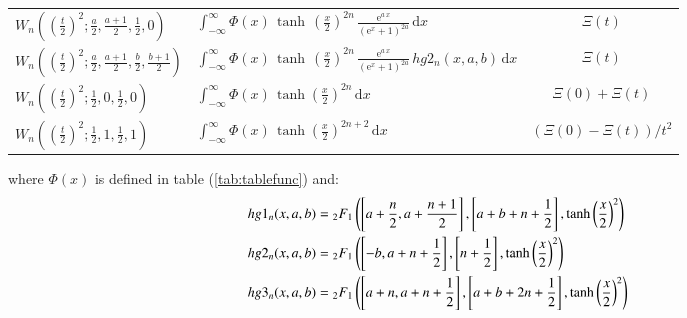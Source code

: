 \documentclass[a4paper,11pt,twoside]{amsart}
\newcommand{\defeq}{=}
\newcommand{\defeq}{\stackrel{\scriptscriptstyle \textnormal{def}}{=}}
\begin{document}
{\begin{minipage}{\textwidth}
\begin{table}[H]
\begin{center}
\begin{tabular}{l|l|c|}
      $W_{n}\left(\left(\frac{t}{2}\right)^2;\frac{a}{2},\frac{a+1}{2},\frac12,0\right) $ & $\displaystyle \int_{-\infty}^{\infty} \Phi(x)\,\tanh\,\left(\frac{x}{2}\right)^{2n}\,\frac{\textrm{e}^{a\,x}}{(\textrm{e}^x+1)^{2a}}\,\mathrm{d}x$ &$\Xi(t)$ \\
      $W_{n}\left(\left(\frac{t}{2}\right)^2;\frac{a}{2},\frac{a+1}{2},\frac{b}{2},\frac{b+1}{2}\right)$ & $\displaystyle \int_{-\infty}^{\infty} \Phi(x)\,\tanh\,\left(\frac{x}{2}\right)^{2n}\,\frac{\textrm{e}^{a\,x}}{(\textrm{e}^x+1)^{2a}} \,hg2_n(x,a,b) \,\mathrm{d}x$ &$\Xi(t)$ \\
      $W_n\left(\left(\frac{t}{2}\right)^2;\frac12,0,\frac12,0\right)$ & $\displaystyle \int_{-\infty}^\infty \Phi(x)\,\tanh\left(\frac{x}{2}\right)^{2n}\, \mathrm{d}x $  &$\Xi(0) + \Xi(t)$ \\    
      $W_n\left(\left(\frac{t}{2}\right)^2;\frac12,1,\frac12,1\right)$ & $\displaystyle \int_{-\infty}^\infty \Phi(x)\,\tanh\left(\frac{x}{2}\right)^{2n+2}\, \mathrm{d}x $  &$\left(\Xi(0)-\Xi(t)\right)/t^2 $ \\       
    \end{tabular}
  \end{center}
\end{table}
where $\Phi(x)$ is defined in table (\ref{tab:tablefunc}) and:
\begin{align}
 hg1_n(x,a,b) &\defeq {}_2F_1\left(\left[a+\frac{n}{2}, a+\frac{n+1}{2}\right],\left[a+b+n+\frac12\right],\tanh\left(\frac{x}{2}\right)^2\right) \notag \\
 hg2_n(x,a,b) &\defeq {}_2F_1\left(\left[-b, a+n+\frac12\right],\left[n+\frac12\right],\tanh\left(\frac{x}{2}\right)^2\right) \notag \\
 hg3_n(x,a,b) &\defeq {}_2F_1\left(\left[a+n, a+n+\frac12\right],\left[a+b+2n+\frac12\right],\tanh\left(\frac{x}{2}\right)^2\right) \notag
\end{align} 
\end{minipage}}
\end{document}
